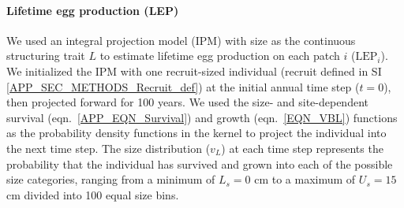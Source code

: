 \documentclass[12pt, oneside]{article}   	%
\begin{document}




\paragraph*{Lifetime egg production (LEP)}

We used an integral projection model (IPM) \citep{ellner2016data} with size as the continuous structuring trait $L$ to estimate lifetime egg production on each patch $i$ ($\text{LEP}_i$). We initialized the IPM with one recruit-sized individual (recruit defined in SI \ref{APP_SEC_METHODS_Recruit_def}) at the initial annual time step ($t=0$), then projected forward for 100 years. We used the size- and site-dependent survival (eqn.\ \ref{APP_EQN_Survival}) and growth (eqn.\ \ref{EQN_VBL}) functions as the probability density functions in the kernel to project the individual into the next time step. The size distribution ($v_L$) at each time step represents the probability that the individual has survived and grown into each of the possible size categories, ranging from a minimum of $L_s=0$ cm to a maximum of $U_s=15$ cm divided into 100 equal size bins. %
\end{document}
